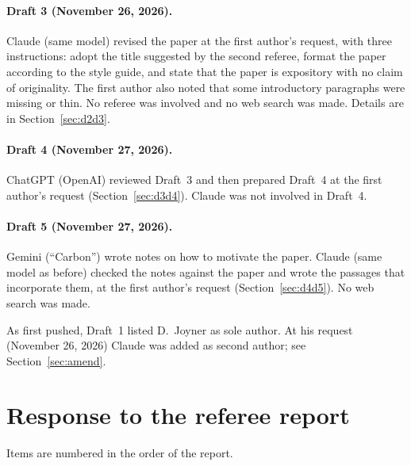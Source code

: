 \documentclass[12pt,letterpaper]{article}
\begin{document}
\paragraph{Draft 3 (November 26, 2026).} Claude (same model) revised the
paper at the first author's request, with three instructions: adopt the
title suggested by the second referee, format the paper according to the
style guide, and state that the paper is expository with no claim of
originality. The first author also noted that some introductory
paragraphs were missing or thin. No referee was involved and no web
search was made. Details are in Section~\ref{sec:d2d3}.

\paragraph{Draft 4 (November 27, 2026).} ChatGPT (OpenAI) reviewed
Draft~3 and then prepared Draft~4 at the first author's request
(Section~\ref{sec:d3d4}). Claude was not involved in Draft~4.

\paragraph{Draft 5 (November 27, 2026).} Gemini (``Carbon'') wrote notes
on how to motivate the paper. Claude (same model as before) checked the
notes against the paper and wrote the passages that incorporate them, at
the first author's request (Section~\ref{sec:d4d5}). No web search was
made.

\noindent As first pushed, Draft~1 listed D.~Joyner as sole author. At
his request (November 26, 2026) Claude was added as second author; see
Section~\ref{sec:amend}.

\section{Response to the referee report}\label{sec:referee}

Items are numbered in the order of the report.
\end{document}
